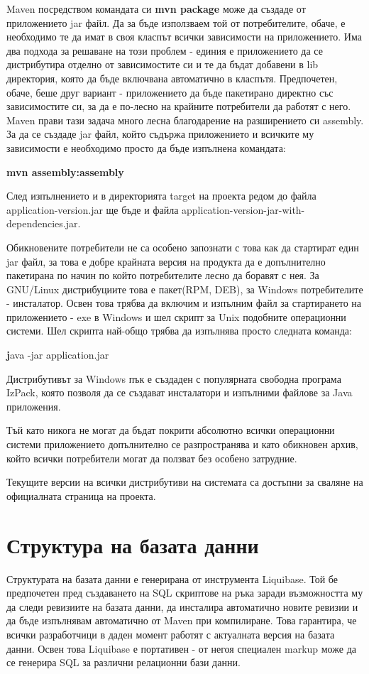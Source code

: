 Maven посредством командата си \textbf{mvn package} може да създаде от
приложението jar файл. Да за бъде използваем той от потребителите,
обаче, е необходимо те да имат в своя класпът всички зависимости на
приложението. Има два подхода за решаване на този проблем - единия е
приложението да се дистрибутира отделно от зависимостите си и те да
бъдат добавени в lib директория, която да бъде включвана автоматично в
класпътя. Предпочетен, обаче, беше друг вариант - приложението да бъде
пакетирано директно със зависимостите си, за да е по-лесно на крайните
потребители да работят с него. Maven прави тази задача много лесна
благодарение на разширението си assembly. За да се създаде jar файл,
който съдържа приложението и всичките му зависимости е необходимо
просто да бъде изпълнена командата:

\textbf{mvn assembly:assembly}

След изпълнението и в директорията target на проекта редом до файла
application-version.jar ще бъде и файла
application-version-jar-with-dependencies.jar.

Обикновените потребители не са особено запознати с това как да
стартират един jar файл, за това е добре крайната версия на продукта
да е допълнително пакетирана по начин по който потребителите лесно да
боравят с нея. За GNU/Linux дистрибуциите това е пакет(RPM, DEB), за
Windows потребителите - инсталатор. Освен това трябва да включим и
изпълним файл за стартирането на приложението - exe в Windows и шел
скрипт за Unix подобните операционни системи. Шел скрипта най-общо
трябва да изпълнява просто следната команда:

\textbf java -jar application.jar

Дистрибутивът за Windows пък е създаден с популярната свободна
програма IzPack, която позволя да се създават инсталатори и изпълними
файлове за Java приложения. 

Тъй като никога не могат да бъдат покрити абсолютно всички операционни
системи приложението допълнително се разпространява и като обикновен
архив, който всички потребители могат да ползват без особено
затрудние. 

Текущите версии на всички дистрибутиви на системата са достъпни за
сваляне на официалната страница на проекта.
\section{Структура на базата данни}

Структурата на базата данни е генерирана от инструмента Liquibase. Той
бе предпочетен пред създаването на SQL скриптове на ръка заради
възможността му да следи ревизиите на базата данни, да инсталира
автоматично новите ревизии и да бъде изпълнявам автоматично от Maven
при компилиране. Това гарантира, че всички разработчици в даден момент
работят с актуалната версия на базата данни. Освен това Liquibase е
портативен - от негоя специален markup може да се генерира SQL за
различни релационни бази данни.

